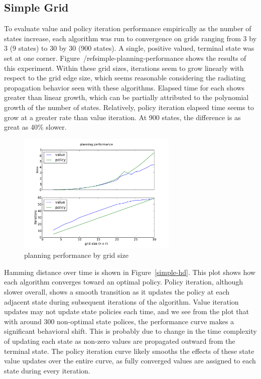 \documentclass{sig-alternate}
\begin{document}
\subsection{Simple Grid}

To evaluate value and policy iteration performance empirically as the number of states increase, each algorithm was run to convergence on grids ranging from 3 by 3 (9 states) to 30 by 30 (900 states). A single, positive valued, terminal state was set at one corner. Figure~/ref{simple-planning-performance} shows the results of this experiment. Within these grid sizes, iterations seem to grow linearly with respect to the grid edge size, which seems reasonable considering the radiating propagation behavior seen with these algorithms. Elapsed time for each shows greater than linear growth, which can be partially attributed to the polynomial growth of the number of states. Relatively, policy iteration elapsed time seems to grow at a greater rate than value iteration. At 900 states, the difference is as great as 40\% slower.


\begin{figure}[!htbp]
    \centering
    \includegraphics[width=3in]{images/simple/planning-performance.pdf}
    \caption{planning performance by grid size \label{simple-planning-performance}}
\end{figure} 

Hamming distance over time is shown in Figure~\ref{simple-hd}. This plot shows how each algorithm converges toward an optimal policy. Policy iteration, although slower overall, shows a smooth transition as it updates the policy at each adjacent state during subsequent iterations of the algorithm. Value iteration updates may not update state policies each time, and we see from the plot that with around 300 non-optimal state polices, the performance curve makes a significant behavioral shift. This is probably due to change in the time complexity of updating each state as non-zero values are propagated outward from the terminal state. The policy iteration curve likely smooths the effects of these state value updates over the entire curve, as fully converged values are assigned to each state during every iteration.
\end{document}
